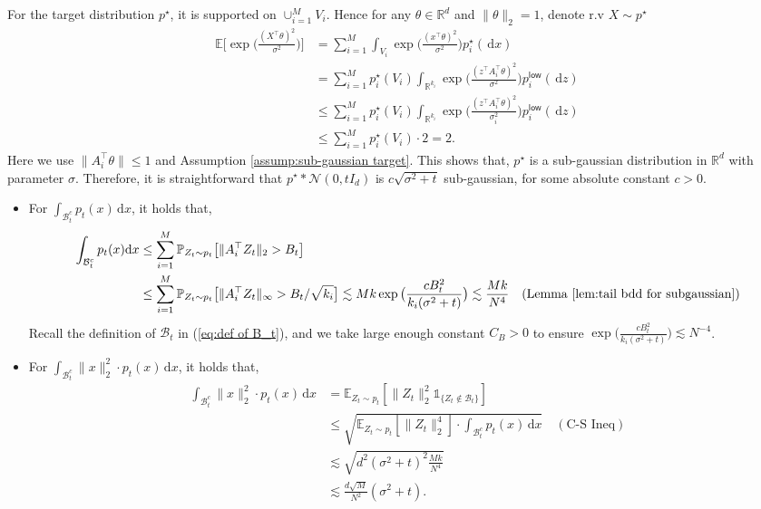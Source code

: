 \documentclass{article}
\newcommand{\ind}{\mathds{1}}
\newcommand{\bE}{\mathbb{E}}
\newcommand{\bP}{\mathbb{P}}
\newcommand{\diff}{\,\mathrm{d}}
\newcommand{\low}{\mathsf{low}}
\theoremstyle{plain}
\theoremstyle{remark}
\begin{document}
For the target distribution $p^\star$, it is supported on $\cup_{i=1}^M V_i$. 
Hence for any $\theta \in \mathbb{R}^d$ and $\| \theta\|_2 =1$, denote r.v $X \sim p^\star$
\begin{align*}
    \mathbb{E}\Big[ \exp \Big( \frac{(X^{\top}\theta)^2}{\sigma^2}\Big)\Big] &= \sum_{i=1}^M \int_{V_i} \exp \Big( \frac{(x^{\top}\theta)^2}{\sigma^2} \Big) p_i^\star(\!\diff x) \\
    & = \sum_{i=1}^M p_i^\star(V_i) \int_{\mathbb{R}^{k_i}}\exp \Big( \frac{(z^{\top}A_i^{\top}\theta)^2}{\sigma^2} \Big) p_i^{\low}(\!\diff z) \\
    & \leq \sum_{i=1}^M p_i^\star(V_i) \int_{\mathbb{R}^{k_i}}\exp \Big( \frac{(z^{\top}A_i^{\top}\theta)^2}{\sigma_i^2} \Big) p_i^{\low}(\!\diff z) \\
    &\leq \sum_{i=1}^M p_i^\star(V_i) \cdot 2 = 2.
\end{align*}
Here we use $\| A_i^{\top}\theta \| \leq 1$ and Assumption \ref{assump:sub-gaussian target}. 
This shows that, $p^\star$ is a sub-gaussian distribution in $\mathbb{R}^d$ with parameter $\sigma$. 
Therefore, it is straightforward that $p^\star \ast \mathcal{N}(0,tI_d)$ is $c\sqrt{\sigma^2 +t}$ sub-gaussian, for some absolute constant $c>0$. 

\begin{itemize}
    \item For $\int_{\mathcal{B}_t^c} p_t(x)\!\diff x$, it holds that, 
    \begin{align*}
        \int_{\mathcal{B}_t^c} p_t(x)\!\diff x &\leq \sum_{i=1}^M \bP_{Z_t \sim p_t} \big[\|A_i^{\top}Z_t\|_2>B_t\big] \\
        & \leq \sum_{i=1}^M  \bP_{Z_t \sim p_t} \big[\|A_i^{\top}Z_t\|_{\infty}>B_t/\sqrt{k_i}\big] \lesssim Mk \exp\big( \frac{cB_t^2}{k_i(\sigma^2+t)}\big) \lesssim \frac{Mk}{N^4}\quad  (\text{Lemma \ref{lem:tail bdd for subgaussian}})
    \end{align*}
    Recall the definition of $\mathcal{B}_t$ in (\ref{eq:def of B_t}), and we take large enough constant $C_B>0$ to ensure $\exp\big( \frac{cB_t^2}{k_i(\sigma^2+t)}\big)\lesssim N^{-4}$. 

    \item For $\int_{\mathcal{B}_t^c} \|x\|_2^2\cdot p_t(x)\!\diff x$, it holds that, 
    \begin{align*}
        \int_{\mathcal{B}_t^c} \|x\|_2^2\cdot p_t(x)\!\diff x  &= \mathbb{E}_{Z_t \sim p_t} [\| Z_t \|_2^2 \ind_{\{ Z_t\notin \mathcal{B}_t\}}] \\
        & \leq \sqrt{\bE_{Z_t \sim p_t}[\|Z_t\|_2^4] \cdot \int_{\mathcal{B}_t^c} p_t(x) \!\diff x} \quad (\text{C-S Ineq})\\
        & \lesssim \sqrt{d^2(\sigma^2+t)^2 \frac{Mk}{N^4}}\\
        &\lesssim \frac{d\sqrt{M}}{N^2} (\sigma^2+t).  
    \end{align*}
\end{itemize}
\end{document}
